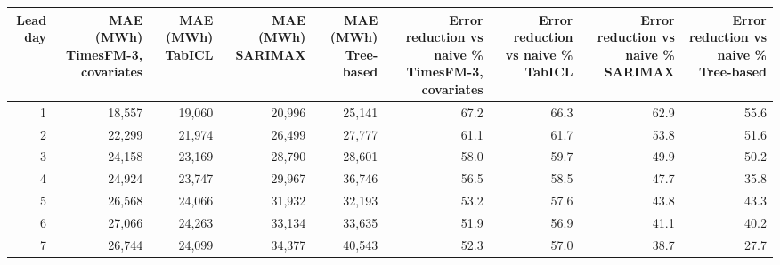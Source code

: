 \begin{tabular}{rrrrrrrrr}
\toprule
Lead day & MAE (MWh) TimesFM-3, covariates & MAE (MWh) TabICL & MAE (MWh) SARIMAX & MAE (MWh) Tree-based & Error reduction vs naive \% TimesFM-3, covariates & Error reduction vs naive \% TabICL & Error reduction vs naive \% SARIMAX & Error reduction vs naive \% Tree-based \\
\midrule
1 & 18,557 & 19,060 & 20,996 & 25,141 & 67.2 & 66.3 & 62.9 & 55.6 \\
2 & 22,299 & 21,974 & 26,499 & 27,777 & 61.1 & 61.7 & 53.8 & 51.6 \\
3 & 24,158 & 23,169 & 28,790 & 28,601 & 58.0 & 59.7 & 49.9 & 50.2 \\
4 & 24,924 & 23,747 & 29,967 & 36,746 & 56.5 & 58.5 & 47.7 & 35.8 \\
5 & 26,568 & 24,066 & 31,932 & 32,193 & 53.2 & 57.6 & 43.8 & 43.3 \\
6 & 27,066 & 24,263 & 33,134 & 33,635 & 51.9 & 56.9 & 41.1 & 40.2 \\
7 & 26,744 & 24,099 & 34,377 & 40,543 & 52.3 & 57.0 & 38.7 & 27.7 \\
\bottomrule
\end{tabular}
